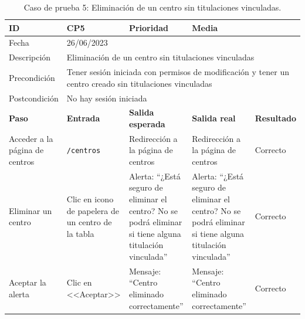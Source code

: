 \begin{table}[H]
\begin{tabular}{p{} p{} p{} p{} p{}}
\cellcolor{gray!25}
ID   & CP5 & \cellcolor{gray!25} Prioridad   & Media \\ \hline
\cellcolor{gray!25} Fecha	&	\multicolumn{4}{l}{26/06/2023} \\ \hline
\cellcolor{gray!25} Descripción		&	\multicolumn{4}{l}{Eliminación de un centro sin titulaciones vinculadas} \\ \hline                                            
\cellcolor{gray!25}
Precondición  & \multicolumn{4}{p{.66\textwidth}}{Tener sesión iniciada con permisos de modificación y tener un centro creado sin titulaciones vinculadas} \\ \hline
\cellcolor{gray!25} Postcondición & \multicolumn{4}{l}{No hay sesión iniciada}                                                    \\ \hline
\rowcolor{gray!25}
\textbf{Paso}   & \textbf{Entrada} & \textbf{Salida esperada} & \textbf{Salida real} & \textbf{Resultado} \\ \hline
Acceder a la página de centros 
& \texttt{/centros}                                                                             
& Redirección a la página de centros                                   
& Redirección a la página de centros                                   
& Correcto                            
\\ \hline
Eliminar un centro
& Clic en icono de papelera de un centro de la tabla
& Alerta: ``¿Está seguro de eliminar el centro? No se podrá eliminar si tiene alguna titulación vinculada''
& Alerta: ``¿Está seguro de eliminar el centro? No se podrá eliminar si tiene alguna titulación vinculada''                              
& Correcto
\\ \hline
Aceptar la alerta
& Clic en <<Aceptar>>
& Mensaje: ``Centro eliminado correctamente''                              
& Mensaje: ``Centro eliminado correctamente''                             
& Correcto                            
\\ \hline                
\end{tabular}
\caption{Caso de prueba 5: Eliminación de un centro sin titulaciones vinculadas.}
\end{table}

